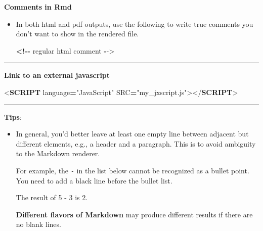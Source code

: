\documentclass[
]{book}
\newenvironment{Shaded}{\begin{snugshade}}{\end{snugshade}}
\newcommand{\DataTypeTok}[1]{\textcolor[rgb]{0.13,0.29,0.53}{#1}}
\newcommand{\KeywordTok}[1]{\textcolor[rgb]{0.13,0.29,0.53}{\textbf{#1}}}
\newcommand{\NormalTok}[1]{#1}
\newcommand{\OperatorTok}[1]{\textcolor[rgb]{0.81,0.36,0.00}{\textbf{#1}}}
\newcommand{\OtherTok}[1]{\textcolor[rgb]{0.56,0.35,0.01}{#1}}
\newcommand{\SpecialCharTok}[1]{\textcolor[rgb]{0.81,0.36,0.00}{\textbf{#1}}}
\newcommand{\SpecialStringTok}[1]{\textcolor[rgb]{0.31,0.60,0.02}{#1}}
\newcommand{\StringTok}[1]{\textcolor[rgb]{0.31,0.60,0.02}{#1}}
\theoremstyle{definition}
\theoremstyle{definition}
\theoremstyle{definition}
\theoremstyle{definition}
\theoremstyle{remark}
\begin{document}
\textbf{Comments in Rmd}

\begin{itemize}
\item
  In both html and pdf outputs, use the following to write true comments you don't want to show in the rendered file.

\begin{Shaded}
\begin{Highlighting}[]
\SpecialCharTok{\textless{}!{-}{-}}\NormalTok{ regular html comment }\SpecialCharTok{{-}}\OtherTok{{-}\textgreater{}} 
\end{Highlighting}
\end{Shaded}
\end{itemize}

\begin{center}\rule{0.5\linewidth}{0.5pt}\end{center}

\textbf{Link to an external javascript}

\begin{Shaded}
\begin{Highlighting}[]
\DataTypeTok{\textless{}}\KeywordTok{SCRIPT}\OtherTok{ language}\OperatorTok{=}\StringTok{"JavaScript"}\OtherTok{ SRC}\OperatorTok{=}\StringTok{"my\_jxscript.js"}\DataTypeTok{\textgreater{}\textless{}/}\KeywordTok{SCRIPT}\DataTypeTok{\textgreater{}}
\end{Highlighting}
\end{Shaded}

\begin{center}\rule{0.5\linewidth}{0.5pt}\end{center}

\textbf{Tips}:

\begin{itemize}
\item
  In general, you'd better leave at least one empty line between adjacent but different elements, e.g., a header and a paragraph. This is to avoid ambiguity to the Markdown renderer.

  For example, the \texttt{-} in the list below cannot be recognized as a bullet point. You need to add a black line before the bullet list.

\begin{Shaded}
\begin{Highlighting}[]
\NormalTok{The result of 5}
\SpecialStringTok{{-} }\NormalTok{3 is 2.}
\end{Highlighting}
\end{Shaded}

  \textbf{Different flavors of Markdown} may produce different results if there are no blank lines. 🙈🙈
\end{itemize}
\end{document}

